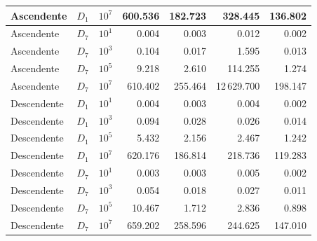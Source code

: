 \begin{table}[htbp]
\begin{tabular}{|l|c|c|r|r|r|r|}
Ascendente & $D_{1}$ & $10^{7}$ & 600.536 & 182.723 & 328.445 & 136.802 \\ \hline
Ascendente & $D_{7}$ & $10^{1}$ & 0.004 & 0.003 & 0.012 & 0.002 \\ \hline
Ascendente & $D_{7}$ & $10^{3}$ & 0.104 & 0.017 & 1.595 & 0.013 \\ \hline
Ascendente & $D_{7}$ & $10^{5}$ & 9.218 & 2.610 & 114.255 & 1.274 \\ \hline
Ascendente & $D_{7}$ & $10^{7}$ & 610.402 & 255.464 & 12\,629.700 & 198.147 \\ \hline
Descendente & $D_{1}$ & $10^{1}$ & 0.004 & 0.003 & 0.004 & 0.002 \\ \hline
Descendente & $D_{1}$ & $10^{3}$ & 0.094 & 0.028 & 0.026 & 0.014 \\ \hline
Descendente & $D_{1}$ & $10^{5}$ & 5.432 & 2.156 & 2.467 & 1.242 \\ \hline
Descendente & $D_{1}$ & $10^{7}$ & 620.176 & 186.814 & 218.736 & 119.283 \\ \hline
Descendente & $D_{7}$ & $10^{1}$ & 0.003 & 0.003 & 0.005 & 0.002 \\ \hline
Descendente & $D_{7}$ & $10^{3}$ & 0.054 & 0.018 & 0.027 & 0.011 \\ \hline
Descendente & $D_{7}$ & $10^{5}$ & 10.467 & 1.712 & 2.836 & 0.898 \\ \hline
Descendente & $D_{7}$ & $10^{7}$ & 659.202 & 258.596 & 244.625 & 147.010 \\ \hline
\end{tabular}
\label{tab:sorting_tiempo}
\end{table}

